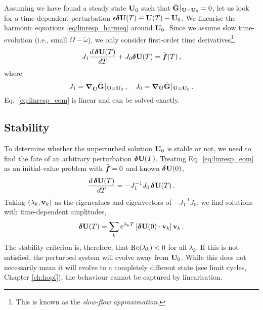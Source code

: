 Assuming we have found a steady state $\vb{U}_0$ such that $\bar{\vb{G}}\, \vline\,_{\vb{U} = \vb{U}_0} = 0$, let us look for a time-dependent perturbation $\epsilon \boldsymbol{\delta} \vb{U}(T) \equiv \vb{U}(T) - \vb{U}_0$. We linearise the harmonic equations \eqref{eq:linresp_harmeq} around $\vb{U}_0$. Since we assume slow time-evolution (i.e., small $\Omega - \tilde{\omega} $), we only consider first-order time derivatives\footnote{This is known as the \textit{slow-flow approximation}.},
\begin{equation} \label{eq:linresp_eom}
J_1 \frac{d \, \boldsymbol{\delta} \vb{U} (T)}{d T} + J_0 \boldsymbol{\delta} \vb{U}(T) = \bar{\boldsymbol{f}}(T)\,,
\end{equation}
where 
\begin{equation}
J_1 = \boldsymbol{\nabla}_{\dot{\vb{U}}} \bar{\vb{G}}\, \vline\,_{\vb{U} = \vb{U}_0} \,, \quad J_0 = \boldsymbol{\nabla}_{\vb{U}} \bar{\vb{G}}\, \vline\,_{\vb{U} = \vb{U}_0} \,.
\end{equation}
Eq.~\eqref{eq:linresp_eom} is linear and can be solved exactly.
\subsection{Stability}

To determine whether the unperturbed solution $\vb{U}_0$ is stable or not, we need to find the fate of an arbitrary perturbation $\boldsymbol{\delta} \vb{U}(T)$. Treating Eq.~\eqref{eq:linresp_eom} as an initial-value problem with $\bar{\boldsymbol{f}} =0$ and known $\boldsymbol{\delta} \vb{U}(0)$,
\begin{equation} \label{eq:linresp_eom_pert}
\frac{d \, \boldsymbol{\delta} \vb{U} (T)}{d T} = - J_1^{-1} J_0\, \boldsymbol{\delta} \vb{U}(T) \,.
\end{equation}
Taking $(\lambda_k, \vb{v}_k)$ as the eigenvalues and eigenvectors of $-J_1^{-1} J_0$, we find solutions with time-dependent amplitudes,
\begin{equation}
\boldsymbol{\delta} \vb{U}(T) = \sum_k {\rm e}^{\lambda_k T } \left[ \boldsymbol{\delta} \vb{U}(0) \cdot \vb{v}_k \right] \vb{v}_k \,.
\end{equation}
The stability criterion is, therefore, that $\text{Re} (\lambda_k) < 0$ for all $\lambda_k$. If this is not satisfied, the perturbed system will evolve away from $\vb{U}_0$. While this does not necessarily mean it will evolve to a completely different state (see limit cycles, Chapter \ref{ch:hopf}), the behaviour cannot be captured by linearisation.

